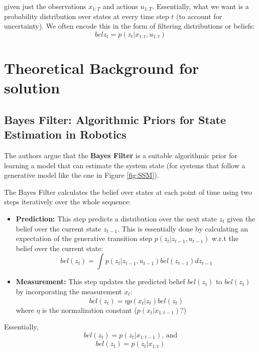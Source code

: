 \documentclass[10pt,twocolumn,letterpaper]{article}
\begin{document}
	given just the observations $x_{1:T}$ and actions $u_{1:T}$. Essentially, what we want is a probability distribution over states at every time step $t$ (to account for uncertainty). We often encode this in the form of filtering distributions or beliefs:
	\begin{equation}
	bel{z_t} = p(z_t|x_{1:t}, u_{1:t})
	\end{equation}
	
	\section{Theoretical Background for solution}
	
	\subsection{Bayes Filter: Algorithmic Priors for State Estimation in Robotics}
	
	The authors argue that the \textbf{Bayes Filter} is a suitable algorithmic prior for learning a model that can estimate the system state (for systems that follow a generative model like the one in Figure \ref{fig:SSM}).
	
	The Bayes Filter calculates the belief over states at each point of time using two steps iteratively over the whole sequence:
	
	\begin{itemize}
		\item \textbf{Prediction:} This step predicts a distribution over the next state $z_{t}$ given the belief over the current state $z_{t-1}$. This is essentially done by calculating an expectation of the generative transition step $p(z_t|z_{t-1}, u_{t-1})$ w.r.t the belief over the current state:
		\begin{equation}
		bel(z_t) = \int{p(z_t|z_{t-1}, u_{t-1})}\overline{bel}(z_{t-1}) dz_{t-1}
		\end{equation}
		\item \textbf{Measurement:} This step updates the predicted belief $bel(z_t)$ to $\overline{bel}(z_{t})$ by incorporating the measurement $x_t$:
		\begin{equation}
		\overline{bel}(z_t) = \eta p(x_t|z_t)bel(z_t)
		\end{equation}
		where $\eta$ is the normalization constant ($p(x_t|x_{1:t-1})$?)
	\end{itemize}
	
	Essentially,
	\begin{equation}
	bel(z_t) = p(z_t|x_{1:t-1}) \text{, and} 
	\end{equation}
	\begin{equation}
	\overline{bel}(z_t) = p(z_t|x_{1:t})
	\end{equation}
	
\end{document}
